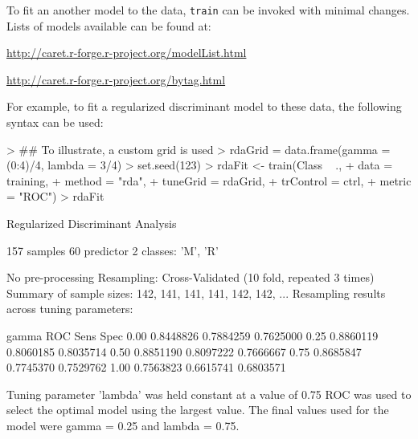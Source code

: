 \documentclass[12pt]{article}
\newcommand{\code}[1]{\mbox{\footnotesize\color{darkblue}\texttt{#1}}}
\renewenvironment{Schunk}{\vspace{\topsep}}{\vspace{\topsep}}
\begin{document}
To fit an another model to the data, \code{train} can be invoked with minimal changes. Lists of models available can be found at:
\begin{center}
\url{http://caret.r-forge.r-project.org/modelList.html}

\url{http://caret.r-forge.r-project.org/bytag.html}
\end{center}
For example, to fit a regularized discriminant model to these data, the following syntax can be used:
\begin{Schunk}
\begin{Sinput}
> ## To illustrate, a custom grid is used
> rdaGrid = data.frame(gamma = (0:4)/4, lambda = 3/4)
> set.seed(123)                    
> rdaFit <- train(Class ~ ., 
+                 data = training,
+                 method = "rda",
+                 tuneGrid = rdaGrid,
+                 trControl = ctrl,
+                 metric = "ROC")
> rdaFit
\end{Sinput}
\begin{Soutput}
Regularized Discriminant Analysis 

157 samples
 60 predictor
  2 classes: 'M', 'R' 

No pre-processing
Resampling: Cross-Validated (10 fold, repeated 3 times) 
Summary of sample sizes: 142, 141, 141, 141, 142, 142, ... 
Resampling results across tuning parameters:

  gamma  ROC        Sens       Spec     
  0.00   0.8448826  0.7884259  0.7625000
  0.25   0.8860119  0.8060185  0.8035714
  0.50   0.8851190  0.8097222  0.7666667
  0.75   0.8685847  0.7745370  0.7529762
  1.00   0.7563823  0.6615741  0.6803571

Tuning parameter 'lambda' was held constant at a value of 0.75
ROC was used to select the optimal model using  the largest value.
The final values used for the model were gamma = 0.25 and lambda = 0.75. 
\end{Soutput}
\end{Schunk}
\end{document}
